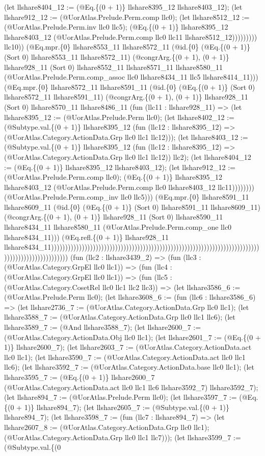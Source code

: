 \documentclass[11pt]{article}
\begin{document}
(let llshare8404\_12 := (@Eq.\{(0 + 1)\} llshare8395\_12 llshare8403\_12); (let llshare912\_12 := (@UorAtlas.Prelude.Perm.comp llc0); (let llshare8512\_12 := (@UorAtlas.Prelude.Perm.inv llc0 llc5); (@Eq.\{(0 + 1)\} llshare8395\_12 llshare8403\_12 (@UorAtlas.Prelude.Perm.comp llc0 llc11 llshare8512\_12))))))))) llc10)) (@Eq.mpr.\{0\} llshare8553\_11 llshare8572\_11 (@id.\{0\} (@Eq.\{(0 + 1)\} (Sort 0) llshare8553\_11 llshare8572\_11) (@congrArg.\{(0 + 1), (0 + 1)\} llshare928\_11 (Sort 0) llshare8552\_11 llshare8571\_11 llshare8580\_11 (@UorAtlas.Prelude.Perm.comp\_assoc llc0 llshare8434\_11 llc5 llshare8414\_11))) (@Eq.mpr.\{0\} llshare8572\_11 llshare8591\_11 (@id.\{0\} (@Eq.\{(0 + 1)\} (Sort 0) llshare8572\_11 llshare8591\_11) (@congrArg.\{(0 + 1), (0 + 1)\} llshare928\_11 (Sort 0) llshare8570\_11 llshare8486\_11 (fun (llc11 : llshare928\_11) => (let llshare8395\_12 := (@UorAtlas.Prelude.Perm llc0); (let llshare8402\_12 := (@Subtype.val.\{(0 + 1)\} llshare8395\_12 (fun (llc12 : llshare8395\_12) => (@UorAtlas.Category.ActionData.Grp llc0 llc1 llc12))); (let llshare8403\_12 := (@Subtype.val.\{(0 + 1)\} llshare8395\_12 (fun (llc12 : llshare8395\_12) => (@UorAtlas.Category.ActionData.Grp llc0 llc1 llc12)) llc2); (let llshare8404\_12 := (@Eq.\{(0 + 1)\} llshare8395\_12 llshare8403\_12); (let llshare912\_12 := (@UorAtlas.Prelude.Perm.comp llc0); (@Eq.\{(0 + 1)\} llshare8395\_12 llshare8403\_12 (@UorAtlas.Prelude.Perm.comp llc0 llshare8403\_12 llc11)))))))) (@UorAtlas.Prelude.Perm.comp\_inv llc0 llc5))) (@Eq.mpr.\{0\} llshare8591\_11 llshare8609\_11 (@id.\{0\} (@Eq.\{(0 + 1)\} (Sort 0) llshare8591\_11 llshare8609\_11) (@congrArg.\{(0 + 1), (0 + 1)\} llshare928\_11 (Sort 0) llshare8590\_11 llshare8434\_11 llshare8580\_11 (@UorAtlas.Prelude.Perm.comp\_one llc0 llshare8434\_11))) (@Eq.refl.\{(0 + 1)\} llshare928\_11 llshare8434\_11)))))))))))))))))))))))))))))))))))))))))))))))))))))))))))))))))))))))))))))))))))))))))))))))))) (fun (llc2 : llshare3439\_2) => (fun (llc3 : (@UorAtlas.Category.GrpEl llc0 llc1)) => (fun (llc4 : (@UorAtlas.Category.GrpEl llc0 llc1)) => (fun (llc5 : (@UorAtlas.Category.CosetRel llc0 llc1 llc2 llc3)) => (let llshare3586\_6 := (@UorAtlas.Prelude.Perm llc0); (let llshare3608\_6 := (fun (llc6 : llshare3586\_6) => (let llshare2736\_7 := (@UorAtlas.Category.ActionData.Grp llc0 llc1); (let llshare3588\_7 := (@UorAtlas.Category.ActionData.Grp llc0 llc1 llc6); (let llshare3589\_7 := (@And llshare3588\_7); (let llshare2600\_7 := (@UorAtlas.Category.ActionData.Obj llc0 llc1); (let llshare2601\_7 := (@Eq.\{(0 + 1)\} llshare2600\_7); (let llshare2603\_7 := (@UorAtlas.Category.ActionData.act llc0 llc1); (let llshare3590\_7 := (@UorAtlas.Category.ActionData.act llc0 llc1 llc6); (let llshare3592\_7 := (@UorAtlas.Category.ActionData.base llc0 llc1); (let llshare3595\_7 := (@Eq.\{(0 + 1)\} llshare2600\_7 (@UorAtlas.Category.ActionData.act llc0 llc1 llc6 llshare3592\_7) llshare3592\_7); (let llshare894\_7 := (@UorAtlas.Prelude.Perm llc0); (let llshare3597\_7 := (@Eq.\{(0 + 1)\} llshare894\_7); (let llshare2605\_7 := (@Subtype.val.\{(0 + 1)\} llshare894\_7); (let llshare3598\_7 := (fun (llc7 : llshare894\_7) => (let llshare2607\_8 := (@UorAtlas.Category.ActionData.Grp llc0 llc1); (@UorAtlas.Category.ActionData.Grp llc0 llc1 llc7))); (let llshare3599\_7 := (@Subtype.val.\{(0 
\end{document}
